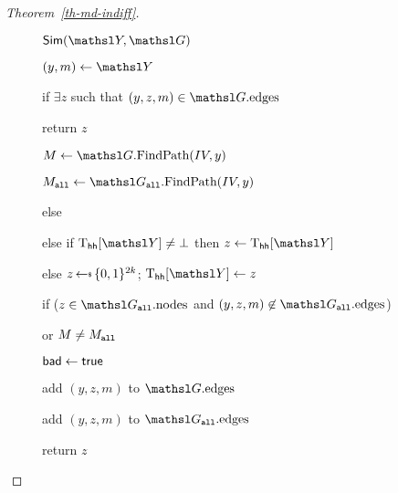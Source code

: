 \begin{proof}[Theorem~\ref{th-md-indiff}]
\begin{figure}
{\ExptSepSpace
	\begin{algorithm}{$\simulator(\YEDSA, \graph)$}
			\item $(y, m) \gets \YEDSA$
			\item if $\exists z$ such that $(y, z, m) \in \graph.\edges$
			\item \quad return $z$
			\item $\msg \gets \graph.\ppathO(\IV, y)$
			\item $\msg_{\all} \gets \graph_{\all}.\ppathO(\IV, y)$
			\item {}
			\item[] \qquad {} 
			\item \quad {}
			\item \qquad {}
			\item \quad else
			\item \qquad {}
			\item \quad \qquad {}
			\item \qquad {}
			\item \qquad {}
			\item else if $\Thh[\YEDSA] \neq \bot$ then $z \gets \Thh[\YEDSA]$
			\item else $z \getsr \bits^{2k}$; $\Thh[\YEDSA] \gets z$
			\item if ($z \in \graph_{\all}.\nodes$ and $(y, z, m) \not\in \graph_{\all}.\edges$)
			\item \quad or ${M} \neq {M}_{\texttt{all}}$
			\item \qquad $\mathsf{bad} \gets \mathsf{true}$
			\item add $(y, z, m)$ to $\graph.\edges$
			\item add $(y, z, m)$ to $\graph_{\all}.\edges$
			\item return $z$
		\end{algorithm}
	}{
	\ExptSepSpace
	
}
\end{figure}
\end{proof}
